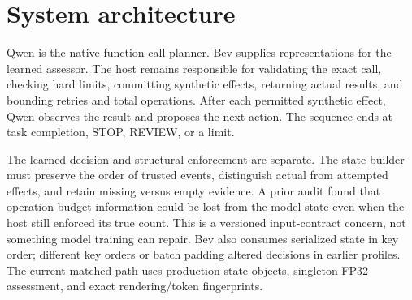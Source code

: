 \documentclass[11pt]{article}
\begin{document}
\section{System architecture}
Qwen is the native function-call planner. Bev supplies representations for the learned assessor. The host remains responsible for validating the exact call, checking hard limits, committing synthetic effects, returning actual results, and bounding retries and total operations. After each permitted synthetic effect, Qwen observes the result and proposes the next action. The sequence ends at task completion, STOP, REVIEW, or a limit.

\begin{center}
\end{center}

The learned decision and structural enforcement are separate. The state builder must preserve the order of trusted events, distinguish actual from attempted effects, and retain missing versus empty evidence. A prior audit found that operation-budget information could be lost from the model state even when the host still enforced its true count. This is a versioned input-contract concern, not something model training can repair. Bev also consumes serialized state in key order; different key orders or batch padding altered decisions in earlier profiles. The current matched path uses production state objects, singleton FP32 assessment, and exact rendering/token fingerprints.
\end{document}
